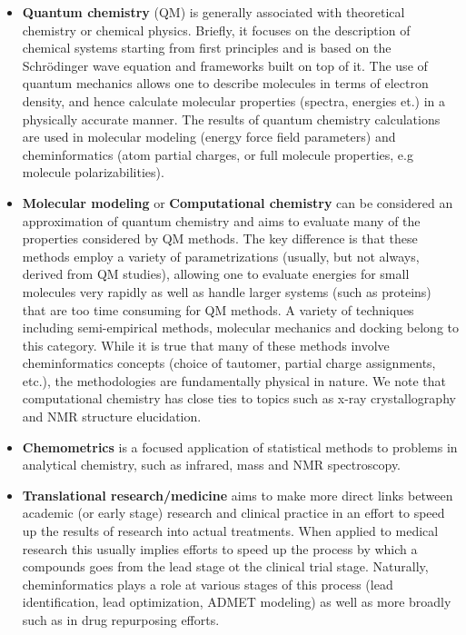 \documentclass{sig-alternate}
\begin{document}
\begin{itemize}
\item \textbf{Quantum chemistry} (QM) is generally associated with
  theoretical chemistry or chemical physics. Briefly, it focuses on
  the description of chemical systems starting from first principles
  and is based on the Schr\"{o}dinger wave equation and frameworks
  built on top of it. The use of quantum mechanics allows one to
  describe molecules in terms of electron density, and hence calculate
  molecular properties (spectra, energies et.) in a physically
  accurate manner.  The results of quantum chemistry calculations are
  used in molecular modeling (energy force field parameters) and
  cheminformatics (atom partial charges, or full molecule properties,
  e.g molecule polarizabilities).
\item \textbf{Molecular modeling} or \textbf{Computational chemistry}
  can be considered an approximation of quantum chemistry and aims to
  evaluate many of the properties considered by QM methods. The key
  difference is that these methods employ a variety of
  parametrizations (usually, but not always, derived from QM studies),
  allowing one to evaluate energies for small molecules very rapidly
  as well as handle larger systems (such as proteins) that are too
  time consuming for QM methods. A variety of techniques including
  semi-empirical methods, molecular mechanics and docking belong to
  this category. While it is true that many of these methods involve
  cheminformatics concepts (choice of tautomer, partial charge
  assignments, etc.), the methodologies are fundamentally physical in
  nature. We note that computational chemistry has close ties to
  topics such as x-ray crystallography and NMR structure elucidation.
\item \textbf{Chemometrics} is a focused application of statistical
  methods to problems in analytical chemistry, such as infrared, mass
  and NMR spectroscopy.
\item \textbf{Translational research/medicine} aims to make more
  direct links between academic (or early stage) research and clinical
  practice in an effort to speed up the results of research into
  actual treatments. When applied to medical research this usually
  implies efforts to speed up the process by which a compounds goes
  from the lead stage ot the clinical trial stage. Naturally,
  cheminformatics plays a role at various stages of this process (lead
  identification, lead optimization, ADMET modeling) as well as more
  broadly such as in drug repurposing efforts.
\end{itemize}
\end{document}
